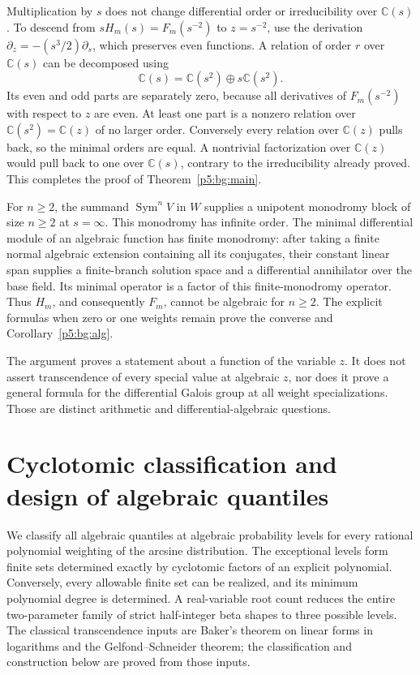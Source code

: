 \documentclass[11pt,a4paper]{article}
\theoremstyle{definition}
\theoremstyle{remark}
\numberwithin{equation}{section}
\begin{document}
Multiplication by $s$ does not change differential order or
irreducibility over $\mathbb C(s)$.  To descend from
$sH_m(s)=F_m(s^{-2})$ to $z=s^{-2}$, use the derivation
$\partial_z=-(s^3/2)\partial_s$, which preserves even functions.
A relation of order $r$ over $\mathbb C(s)$ can be decomposed using
\[
             \mathbb C(s)=\mathbb C(s^2)\oplus s\mathbb C(s^2).
\]
Its even and odd parts are separately zero, because all derivatives
of $F_m(s^{-2})$ with respect to $z$ are even.  At least one part
is a nonzero relation over $\mathbb C(s^2)=\mathbb C(z)$ of no
larger order.  Conversely every relation over $\mathbb C(z)$
pulls back, so the minimal orders are equal.  A nontrivial
factorization over $\mathbb C(z)$ would pull back to one over
$\mathbb C(s)$, contrary to the irreducibility already proved.
This completes the proof of Theorem~\ref{p5:bg:main}.

For $n\ge2$, the summand $\operatorname{Sym}^nV$ in $W$ supplies
a unipotent monodromy block of size $n\ge2$ at $s=\infty$.
This monodromy has infinite order.  The minimal differential
module of an algebraic function has finite monodromy: after taking
a finite normal algebraic extension containing all its conjugates,
their constant linear span supplies a finite-branch solution space
and a differential annihilator over the base field.  Its minimal
operator is a factor of this finite-monodromy operator.
Thus $H_m$, and consequently $F_m$, cannot be algebraic for
$n\ge2$.  The explicit formulas when zero or one weights remain
prove the converse and Corollary~\ref{p5:bg:alg}.

The argument proves a statement about a function of the variable
$z$.  It does not assert transcendence of every special value at
algebraic $z$, nor does it prove a general formula for the differential
Galois group at all weight specializations.  Those are distinct
arithmetic and differential-algebraic questions.



\section{Cyclotomic classification and design of algebraic quantiles}
\label{p5:aq:section}

We classify all algebraic quantiles at algebraic probability levels
for every rational polynomial weighting of the arcsine distribution.
The exceptional levels form finite sets determined exactly by
cyclotomic factors of an explicit polynomial. Conversely, every
allowable finite set can be realized, and its minimum polynomial
degree is determined. A real-variable root count reduces the entire
two-parameter family of strict half-integer beta shapes to three
possible levels. The classical transcendence inputs are Baker's
theorem on linear forms in logarithms and the
Gelfond--Schneider theorem; the classification and construction
below are proved from those inputs.
\end{document}

